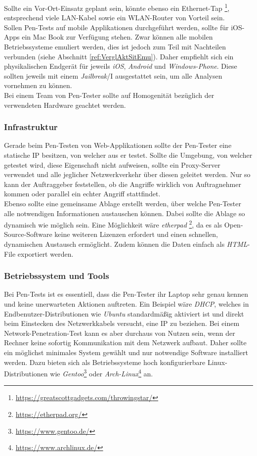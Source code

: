 		Sollte ein Vor-Ort-Einsatz geplant sein, könnte ebenso ein Ethernet-Tap \footnote{\url{https://greatscottgadgets.com/throwingstar/}}, entsprechend viele LAN-Kabel sowie ein WLAN-Router von Vorteil sein.\\
		
		Sollen Pen-Tests auf mobile Applikationen durchgeführt werden, sollte für iOS-Apps ein Mac Book zur Verfügung stehen. Zwar können alle mobilen Betriebssysteme emuliert werden, dies ist jedoch zum Teil mit Nachteilen verbunden (siehe Abschnitt \ref{ref:VerglAktSitEmu}). Daher empfiehlt sich ein physikalischen Endgerät für jeweils \textit{iOS}, \textit{Android} und \textit{Windows-Phone}. Diese sollten jeweils mit einem \textit{Jailbreak}/I ausgestattet sein, um alle Analysen vornehmen zu können.\\
		
		Bei einem Team von Pen-Tester sollte auf Homogenität bezüglich der verwendeten Hardware geachtet werden.

		\subsubsection{Infrastruktur}\label{ref:vorbInfrastruktur}
		Gerade beim Pen-Testen von Web-Applikationen sollte der Pen-Tester eine statische IP besitzen, von welcher aus er testet. Sollte die Umgebung, von welcher getestet wird, diese Eigenschaft nicht aufweisen, sollte ein Proxy-Server verwendet und alle jeglicher Netzwerkverkehr über diesen geleitet werden. Nur so kann der Auftraggeber feststellen, ob die Angriffe wirklich von Auftragnehmer kommen oder parallel ein echter Angriff stattfindet.\\
		
		Ebenso sollte eine gemeinsame Ablage erstellt werden, über welche Pen-Tester alle notwendigen Informationen austauschen können. Dabei sollte die Ablage so dynamisch wie möglich sein. Eine Möglichkeit wäre \textit{etherpad} \footnote{\url{https://etherpad.org/}}, da es als Open-Source-Software keine weiteren Lizenzen erfordert und einen schnellen, dynamischen Austausch ermöglicht. Zudem können die Daten einfach als \textit{HTML}-File exportiert werden.
		
		\subsubsection{Betriebssystem und Tools}
		Bei Pen-Tests ist es essentiell, dass die Pen-Tester ihr Laptop sehr genau kennen und keine unerwarteten Aktionen auftreten. Ein Beispiel wäre \textit{DHCP}, welches in Endbenutzer-Distributionen wie \textit{Ubuntu} standardmäßig aktiviert ist und direkt beim Einstecken des Netzwerkkabels versucht, eine IP zu beziehen. Bei einem Network-Penetration-Test kann es aber durchaus von Nutzen sein, wenn der Rechner keine sofortig Kommunikation mit dem Netzwerk aufbaut. Daher sollte ein möglichst minimales System gewählt und nur notwendige Software installiert werden. Dazu bieten sich als Betriebssysteme hoch konfigurierbare Linux-Distributionen wie \textit{Gentoo}\footnote{\url{https://www.gentoo.de/}} oder \textit{Arch-Linux}\footnote{\url{https://www.archlinux.de/}} an.\\
		 
